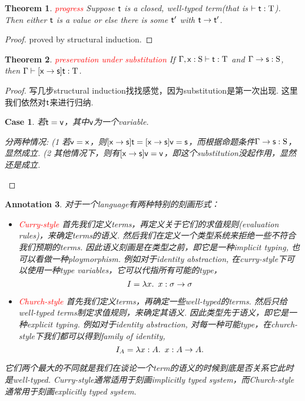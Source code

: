 \documentclass{article}
\theoremstyle{plain}
\newtheorem{theorem}{Theorem}
\newtheorem{annotation}[theorem]{Annotation}
\newtheorem{case}{Case}
\theoremstyle{nonumberplain}
\newtheorem{proof}{Proof}
\newcommand{\lam}[2]{\ensuremath{\lambda #1\ldotp~ #2}} %
\newcommand{\singletype}[1]{\text{#1}}
\newcommand{\termtype}[2]{\ensuremath{#1:#2}}
\newcommand{\term}[1]{\ensuremath\mathsf{#1}}
\newcommand{\redt}[1]{\textcolor{red}{#1}}
\begin{document}
\begin{theorem}
\rm \redt{progress} Suppose $\term{t}$ is a closed, well-typed term(that is $\vdash \termtype{\term{t}}{\singletype{T}}$). Then either $\term{t}$ is a value or else there is some $\term{t}'$ with $\term{t} \to \term{t}'$. 
\end{theorem}

\begin{proof}
proved by structural induction.
\end{proof}

\begin{theorem}
\rm \redt{preservation under substitution} If $\Gamma,  \termtype{\term{x}}{\singletype{S}} \vdash \termtype{\term{t}}{\singletype{T}}$ and $\Gamma \to \termtype{\term{s}}{\singletype{S}}$, then $\Gamma \vdash \termtype{[\term{x} \to \term{s}]\term{t}}{\singletype{T}}$.
\end{theorem}

\begin{proof}
\rm 写几步structural induction找找感觉，因为substitution是第一次出现. 这里我们依然对$\term{t}$来进行归纳.  

\begin{case}
若$\term{t} = \term{v}$，其中$\term{v}$为一个variable. 

分两种情况: (1 若$\term{v} = \term{x}$，则$[\term{x} \to \term{s}]\term{t} = [\term{x} \to \term{s}]\term{v} = \term{s}$，而根据命题条件$\Gamma \to \termtype{\term{s}}{\singletype{S}}$，显然成立. (2 其他情况下，则有$[\term{x} \to \term{s}]\term{v} = \term{v}$，即这个substitution没起作用，显然还是成立. 
\end{case}
\end{proof}

\begin{annotation}
\rm 对于一个language有两种特别的刻画形式：
\begin{itemize}
	\item \redt{Curry-style} 首先我们定义terms，再定义关于它们的求值规则(evaluation rules)，来确定terms的语义. 然后我们在定义一个类型系统来拒绝一些不符合我们预期的terms. 因此语义刻画是在类型之前，即它是一种implicit typing, 也可以看做一种ploymorphism. 例如对于identity abstraction, 在curry-style下可以使用一种type variables，它可以代指所有可能的type， 
	$$
	I = \lam{x}{x} : \sigma \to \sigma
	$$ 
	\item \redt{Church-style} 首先我们定义terms，再确定一些well-typed的terms. 然后只给well-typed terms制定求值规则，来确定其语义. 因此类型先于语义，即它是一种explicit typing. 例如对于identity abstraction, 对每一种可能type，在church-style下我们都可以得到family of identity,
	$$
	I_A = \lam{x:A}{x} : A \to A.
	$$
\end{itemize}
它们两个最大的不同就是我们在谈论一个term的语义的时候到底是否关系它此时是well-typed. Curry-style通常适用于刻画implicitly typed system，而Church-style通常用于刻画explicitly typed system. 
\end{annotation}
\end{document}
